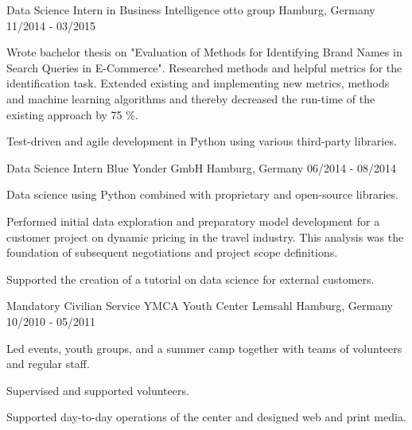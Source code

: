 \begin{cventries}
  \cventry
    {Data Science Intern in Business Intelligence} %
    {otto group} %
    {Hamburg, Germany} %
    {11/2014 - 03/2015} %
    {
      \begin{cvitems} %
        \item {Wrote bachelor thesis on "Evaluation of Methods for Identifying Brand Names in Search Queries in E-Commerce". Researched methods and helpful metrics for the identification task. Extended existing and implementing new metrics, methods and machine learning algorithms and thereby decreased the run-time of the existing approach by 75 \%.}
        \item {Test-driven and agile development in Python using various third-party libraries.}
      \end{cvitems}
    }

  \cventry
    {Data Science Intern} %
    {Blue Yonder GmbH} %
    {Hamburg, Germany} %
    {06/2014 - 08/2014} %
    {
      \begin{cvitems} %
        \item {Data science using Python combined with proprietary and open-source libraries.}
        \item {Performed initial data exploration and preparatory model development for a customer project on dynamic pricing in the travel industry. This analysis was the foundation of subsequent negotiations and project scope definitions.}
        \item{Supported the creation of a tutorial on data science for external customers.}
      \end{cvitems}
    }

  \cventry
    {Mandatory Civilian Service} %
    {YMCA Youth Center Lemsahl} %
    {Hamburg, Germany} %
    {10/2010 - 05/2011} %
    {
      \begin{cvitems} %
        \item {Led events, youth groups, and a summer camp together with teams of volunteers and regular staff.} 
        \item {Supervised and supported volunteers.}
        \item{Supported day-to-day operations of the center and designed web and print media.}
      \end{cvitems}
    }

\end{cventries}
